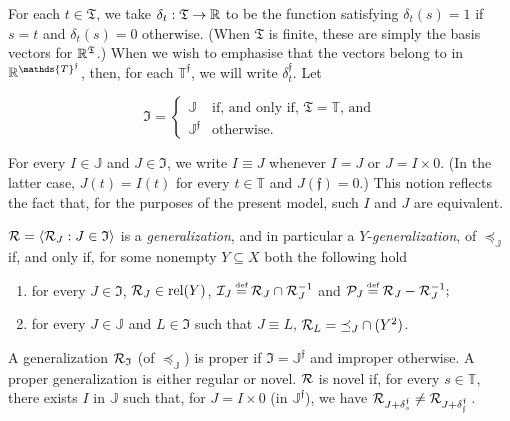 \documentclass[12pt,a4paper,twoside]{article}
\newcommand{\relations}{\operatorname{rel}}
\newcommand{\novel}{\mathfrak f}
\newcommand{\preceqb}{\mathbin{\preceq}}
\newcommand{\ext}{\mathrel{\mc R}}
\newcommand{\extb}{\mathbin{\mc R}}
\newcommand{\sextb}{\mathbin{\mc P}}
\newcommand{\nextb}{\mathbin{\mc I}}
\newcommand{\mbbt}{{\mathds {T}}}
\newcommand{\mbbtp}{{\mathds{T}^\novel}}
\newcommand{\mbbtpp}{{\mathfrak{T}}}
\newcommand{\mbbj}{\mathds J}
\newcommand{\mbbjp}{{\mathds {J}^{\novel}}}
\newcommand{\mbbjpp}{\mathfrak{I}}
\begin{document}
\begin{appendices}
For each $t \in \mbbtpp$, we take $\delta_{t} : \mbbtpp \rightarrow \R$ to be
the function satisfying $\delta_{t} ( s ) = 1$ if $s = t$ and $\delta_{t} ( s )
= 0$ otherwise. (When $\mbbtpp$ is finite, these are simply the basis vectors
for $\R^{\mbbtpp}$.)  When we wish to emphasise that the vectors belong to in
$\R^{\mbbtp}$, then, for each $\mbbtp$, we will write $\delta_{t}^{\novel}$.
Let
\begin{linenomath*}
  \begin{equation*}
    \text{$\mbbjpp$} = \left \{
    \begin{array}{ll}
      \mbbj & \text{if, and only if, $\mbbtpp = \mbbt$, and} \\
      \mbbjp & \text{otherwise.}
    \end{array}\right.
  \end{equation*}
\end{linenomath*}
For every $I \in \mbbj$ and $J \in \mbbjpp$, we write $I \equiv J$ whenever $I
= J$ or $J = I\times 0$. (In the latter case, $J(t)= I(t)$ for every $t\in
\mbbt$ and $J(\novel )= 0$.) This notion reflects the fact that, for the
purposes of the present model, such $I$ and $J$ are equivalent.
\begin{definition}\label{def-{generalization}Q}
 
$\extb =\langle \extb_{J}: J \in \mbbjpp \rangle$ is a
  \emph{{generalization}}, and in particular a $Y$-\emph{{generalization}}, of
  $\preceqb _{\mbbj}$ if, and only if, for some nonempty
  $Y \subseteq X$ both the following hold
\begin{enumerate}

\item for every $J\in \mbbjpp$, $\extb_{J}\in \relations(Y)$,
  $\nextb_{J} \defeq \extb_{J} \cap \extb_{J}^{-1}$ and
  $\sextb_{J} \defeq \extb_{J} \bs \extb_{J}^{-1};$

\item for every $J \in \mbbj$ and $L \in \mbbjpp$ such that $J \equiv
  L$, $\extb_{L} = \preceqb_{J} \cap (Y^2)$. \label{item-preservingQ}
\end{enumerate}
A {generalization} $\ext_{\mbbjpp}$ (of $\preceq_{\mbbj}$) is proper if $\mbbjpp=
\mbbjp$ and improper otherwise.  A proper {generalization} is either regular or
novel. $\ext$ is novel if, for every $s \in \mbbt$, there exists $I$ in $\mbbj$ such that, for $J = I \times 0$ (in $\mbbjp$), we have $\extb _ {J +
  \delta _{s}^{\novel}} \neq \extb _ {J + \delta _ {\novel}^{\novel}
}$\,.
 \end{definition} 


\end{appendices}
\end{document}
